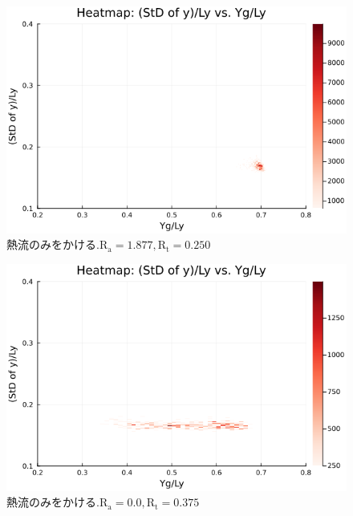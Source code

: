 \begin{figure}[H]
  \centering
  \includegraphics[scale=0.6]{image/g0_heat/2024-01-15T14:07:35.515_mapg0_chiinf_Ay50_rho0.4_T0.43_dT0.04_Rd0.0_Rt0.25_Ra1.877538_g0_run4.0e7.png}
  \caption{$熱流のみをかける. \text{R}_\text{a}=1.877,\text{R}_\text{t}=0.250$}
  \label{}
\end{figure}

\begin{figure}[H]
  \centering
  \includegraphics[scale=0.6]{image/g0_heat/2024-01-15T14:07:35.582_mapg0_chiinf_Ay50_rho0.4_T0.43_dT0.04_Rd0.0_Rt0.375_Ra0.0_g0_run4.0e7.png}
  \caption{$熱流のみをかける. \text{R}_\text{a}=0.0,\text{R}_\text{t}=0.375$}
  \label{}
\end{figure}


